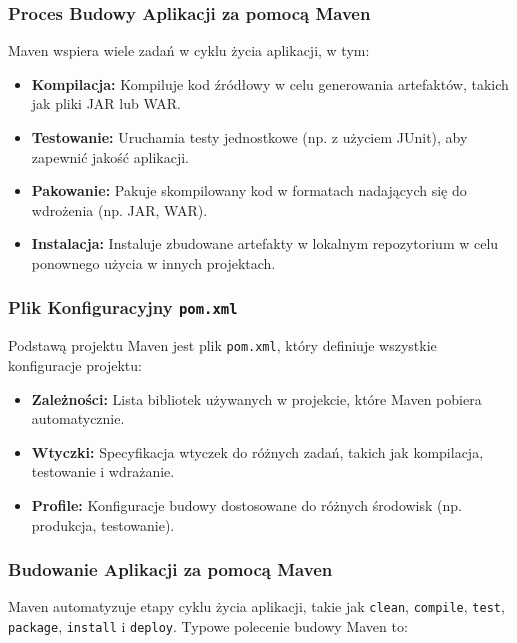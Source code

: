 \subsubsection{Proces Budowy Aplikacji za pomocą Maven}

Maven wspiera wiele zadań w cyklu życia aplikacji, w tym:

\begin{itemize}
    \item \textbf{Kompilacja:} Kompiluje kod źródłowy w celu generowania artefaktów, takich jak pliki JAR lub WAR.
    \item \textbf{Testowanie:} Uruchamia testy jednostkowe (np. z użyciem JUnit), aby zapewnić jakość aplikacji.
    \item \textbf{Pakowanie:} Pakuje skompilowany kod w formatach nadających się do wdrożenia (np. JAR, WAR).
    \item \textbf{Instalacja:} Instaluje zbudowane artefakty w lokalnym repozytorium w celu ponownego użycia w innych projektach.
\end{itemize}

\subsubsection{Plik Konfiguracyjny \texttt{pom.xml}}

Podstawą projektu Maven jest plik \texttt{pom.xml}, który definiuje wszystkie konfiguracje projektu:

\begin{itemize}
    \item \textbf{Zależności:} Lista bibliotek używanych w projekcie, które Maven pobiera automatycznie.
    \item \textbf{Wtyczki:} Specyfikacja wtyczek do różnych zadań, takich jak kompilacja, testowanie i wdrażanie.
    \item \textbf{Profile:} Konfiguracje budowy dostosowane do różnych środowisk (np. produkcja, testowanie).
\end{itemize}

\subsubsection{Budowanie Aplikacji za pomocą Maven}

Maven automatyzuje etapy cyklu życia aplikacji, takie jak \texttt{clean}, \texttt{compile}, \texttt{test}, \texttt{package}, \texttt{install} i \texttt{deploy}. Typowe polecenie budowy Maven to:


